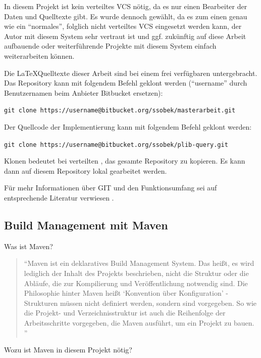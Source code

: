 In diesem Projekt ist kein verteiltes \gls{VCS} nötig, da es nur einen Bearbeiter der Daten und Quelltexte gibt. Es wurde dennoch gewählt, da es zum einen genau wie ein \enquote{normales}, folglich nicht verteiltes \gls{VCS} eingesetzt werden kann, der Autor mit diesem System sehr vertraut ist und ggf. zukünftig auf diese Arbeit aufbauende oder weiterführende Projekte mit diesem System einfach weiterarbeiten können. 

Die \LaTeX Quelltexte dieser Arbeit sind bei einem frei verfügbaren  untergebracht. Das Repository kann mit folgendem Befehl geklont werden (\enquote{username} durch Benutzernamen beim Anbieter Bitbucket ersetzen):

\lstinline[basicstyle=\ttfamily\small\mdseries]{git clone https://username@bitbucket.org/ssobek/masterarbeit.git}

Der Quellcode der Implementierung kann mit folgendem Befehl geklont werden:

\lstinline[basicstyle=\ttfamily\small\mdseries]{git clone https://username@bitbucket.org/ssobek/plib-query.git}

Klonen bedeutet bei verteilten , das gesamte Repository zu kopieren. Es kann dann auf diesem Repository lokal gearbeitet werden. 

Für mehr Informationen über GIT und den Funktionsumfang sei auf entsprechende Literatur verwiesen \citep[vgl.][]{pragGit}. 

\subsection{Build Management mit Maven}

Was ist Maven?

\begin{quotation}
\enquote{Maven ist ein deklaratives Build Management System. Das heißt, es wird lediglich der Inhalt des Projekts beschrieben, nicht die Struktur oder die Abläufe, die zur Kompilierung und Veröffentlichung notwendig sind. Die Philosophie hinter Maven heißt \enquote{Konvention über Konfiguration} - Strukturen müssen nicht definiert werden, sondern sind vorgegeben. So wie die Projekt- und Verzeichnisstruktur ist auch die Reihenfolge der Arbeitsschritte vorgegeben, die Maven ausführt, um ein Projekt zu bauen. \citep[S. 27][]{Mitp-Verlag}}	
\end{quotation}

Wozu ist Maven in diesem Projekt nötig?

